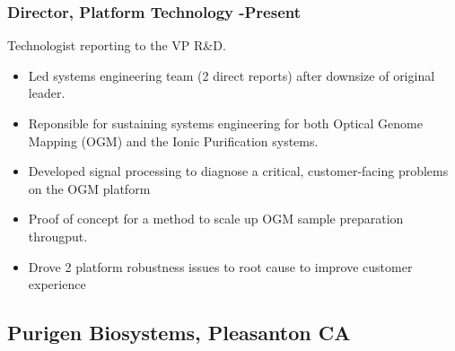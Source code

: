 \documentclass{res}
\begin{document}
\begin{resume}
   \subsubsection{Director, Platform Technology -Present}
   \vspace{-0.2in}
   Technologist reporting to the VP R\&D. 
    \vspace{0.1in}
    \begin{itemize}
     \item Led systems engineering team (2 direct reports) after downsize of original leader. 
     \item Reponsible for sustaining systems engineering for both Optical Genome Mapping (OGM) and the Ionic Purification systems. 
     \item Developed signal processing to diagnose a critical, customer-facing problems on the OGM platform
     \item Proof of concept for a method to scale up OGM sample preparation througput.  
     \item Drove 2 platform robustness issues to root cause to improve customer experience
    \end{itemize}


   \subsection{Purigen Biosystems, Pleasanton CA}
    \vspace{-0.2in}


\end{resume}
\end{document}
